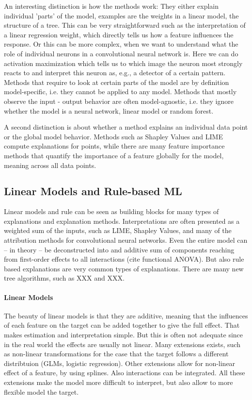 \documentclass[runningheads]{llncs}
\begin{document}
An interesting distinction is how the methods work:
They either explain individual 'parts' of the model, examples are the weights in a linear model, the structure of a tree.
This can be very straightforward such as the interpretation of a linear regression weight, which directly tells us how a feature influences the response.
Or this can be more complex, when we want to understand what the role of individual neurons in a convolutional neural network is.
Here we can do activation maximization which tells us to which image the neuron most strongly reacts to and interpret this neuron as, e.g., a detector of a certain pattern.
Methods that require to look at certain parts of the model are by definition model-specific, i.e. they cannot be applied to any model.
Methods that mostly observe the input - output behavior are often model-agnostic, i.e. they ignore whether the model is a neural network, linear model or random forest.

A second distinction is about whether a method explains an individual data point or the global model behavior.
Methods such as Shapley Values and LIME compute explanations for points, while there are many feature importance methods that quantify the importance of a feature globally for the model, meaning across all data points.

\subsection{Linear Models and Rule-based ML}

Linear models and rule can be seen as building blocks for many types of explanations and explanation methods.
Interpretations are often presented as a weighted sum of the inputs, such as LIME, Shapley Values, and many of the attribution methods for convolutional neural networks.
Even the entire model can -- in theory -- be deconstructed into and additive sum of components reaching from first-order effects to all interactions (cite functional ANOVA).
But also rule based explanations are very common types of explanations.
There are many new tree algorithms, such as XXX and XXX.

\paragraph{Linear Models}
The beauty of linear models is that they are additive, meaning that the influences of each feature on the target can be added together to give the full effect.
That makes estimation and interpretation simple.
But this is often not adequate since in the real world the effects are usually not linear.
Many extensions exists, such as non-linear transformations for the case that the target follows a different distribtuion (GLMs, logistic regression).
Other extensions allow for non-linear effect of a feature, by using splines.
Also interactions can be integrated.
All these extensions make the model more difficult to interpret, but also allow to more flexible model the target.
\end{document}
